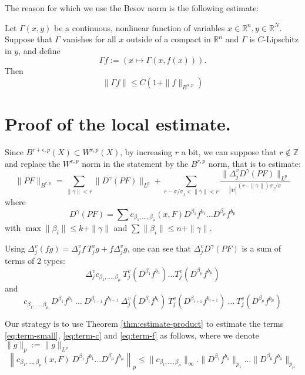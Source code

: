 The reason for which we use the Besov norm is the following estimate:
\begin{theorem}[Composition]
\label{thm:compo-besov}
Let \(\Gamma(x,y)\) be a continuous, nonlinear function of variables \(x\in
\mathbb{R}^n, y\in \mathbb{R}^N\). Suppose that \(\Gamma\) vanishes for all \(x\)
outside of a compact in \(\mathbb{R}^n\) and \(\Gamma\) is \(C\)-Lipschitz in \(y\), and define
\[
\Gamma f:= \left( x\longmapsto \Gamma(x,f(x)) \right).
\]
Then 
\[ 
\|\Gamma f\| \leq C\left( 1+ \|f\|_{B^{\alpha,p}}\right)
\]
\end{theorem}


\section{Proof of the local estimate.}
\label{sec:org63db1f4}
Since \(B^{r+\epsilon,p}(X)\subset W^{r,p}(X)\), by increasing \(r\) a bit, we can
suppose that \(r\not\in \mathbb{Z}\) and replace the \(W^{r,p}\) norm in the statement
by the \(B^{r,p}\) norm, that is to estimate:
\[
 \|PF\|_{B^{r,p}} = \sum_{\|\gamma\| < r} \| D^\gamma(PF)\|_{L^p} + \sum_{
r-\sigma/\sigma_j< \|\gamma\| < r} \frac{\| \Delta^v_j D^\gamma (PF)\|_{L^p}}{|v|^{(r-\|\gamma\|)\sigma_j/\sigma}}
\]
where 
\begin{equation}
\label{eq:term-small}
 D^\gamma (PF) = \sum c_{\beta_1,\dots,\beta_\mu}(x,F) D^{\beta_1} f^{b_1}\dots D^{\beta_\mu}f^{b_\mu}
\end{equation}
with \(\max \|\beta_i\| \leq k +\|\gamma\|\) and \(\sum \|\beta_i\|\leq n + \|\gamma\|\).

Using \(\Delta^v_j (fg) = \Delta^v_j f\ T^v_j g + f \Delta^v_j g\), one can see that \(\Delta^v_j D^\gamma (PF)\) is a sum of terms of 2 types:
\begin{equation}
\label{eq:term-c}
\Delta^v_j c_{\beta_1,\dots,\beta_\mu}\ T^v_j(D^{\beta_1}f^{b_1})\dots T^v_j (D^{\beta_\mu}
f^{b_\mu})
\end{equation}
and
\begin{equation}
\label{eq:term-f}
 c_{\beta_1,\dots,\beta_\mu}\ D^{\beta_1}f^{b_1}\ \dots \ D^{\beta_{i-1}}f^{b_{i-1}}\ \Delta^v_j
(D^{\beta_i} f^{b_i})\ T^v_j(D^{\beta_{i+1}} f^{b_{i+1}})\ \dots\ T^v_j(D^{\beta_\mu} f^{b_\mu})
\end{equation}

Our strategy is to use Theorem \ref{thm:estimate-product} to estimate the terms
\eqref{eq:term-small}, \eqref{eq:term-c} and \eqref{eq:term-f} as follows, where we denote \(\|g\|_p:= \|g\|_{L^p}\)
\begin{equation}
\label{eq:est-term-small}
\left\| c_{\beta_1,\dots,\beta_\mu}(x,F)\ D^{\beta_1} f^{b_1}\dots D^{\beta_\mu}f^{b_\mu} \right\|_{p} \leq \|c_{\beta_1,\dots,\beta_\mu} \|_{\infty}.\|D^{\beta_1} f^{b_1}\|_{p_1}\dots \|D^{\beta_\mu} f^{b_\mu}\|_{p_\mu}
\end{equation}

